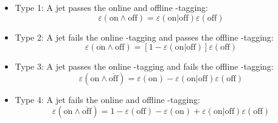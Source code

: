 \begin{itemize}
   \item Type 1: A jet passes the online and offline \Pqb-tagging: 
	  \begin{equation}
		 \varepsilon(\text{on} \land \text{off}) 
		 = \varepsilon(\text{on} | \text{off}) \varepsilon(\text{off})
	  \end{equation}
   \item Type 2: A jet fails the online \Pqb-tagging and passes the offline \Pqb-tagging: 
	  \begin{equation}
		 \varepsilon(\overline{\text{on}} \land \text{off}) 
		 = [1 - \varepsilon(\text{on} | \text{off})] \varepsilon(\text{off})
	  \end{equation}
   \item Type 3: A jet passes the online \Pqb-tagging and fails the offline \Pqb-tagging: 
	  \begin{equation}\label{eq:sf-type3}
		 \varepsilon(\text{on} \land \overline{\text{off}}) 
		 = \varepsilon(\text{on}) - \varepsilon(\text{on} | \text{off}) \varepsilon(\text{off})
	  \end{equation}
   \item Type 4: A jet fails the online and offline \Pqb-tagging: 
	  \begin{equation}\label{eq:sf-type4}
		 \varepsilon(\overline{\text{on}} \land \overline{\text{off}}) 
		 = 1 - \varepsilon(\text{off}) - \varepsilon(\text{on}) + \varepsilon(\text{on} | \text{off}) \varepsilon(\text{off})
	  \end{equation}
\end{itemize}



